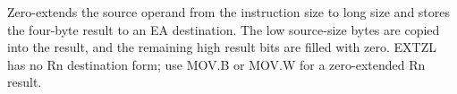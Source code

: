 Zero-extends the source operand from the instruction size to long size and stores the four-byte result to an EA destination. The low source-size bytes are copied into the result, and the remaining high result bits are filled with zero. EXTZL has no Rn destination form; use MOV.B or MOV.W for a zero-extended Rn result.
